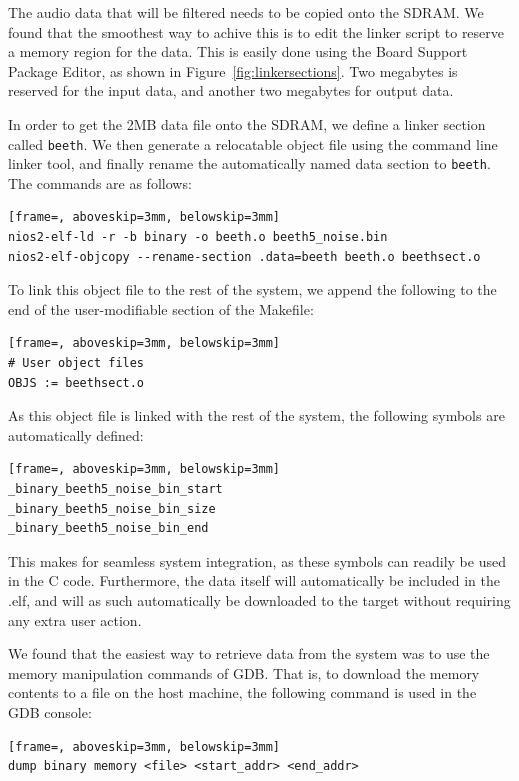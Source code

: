 \documentclass[]{article}
\begin{document}
The audio data that will be filtered needs to be copied onto the SDRAM. We found that the smoothest way to achive this is to edit the linker script to reserve a memory region for the data. This is easily done using the Board Support Package Editor, as shown in Figure~\ref{fig:linkersections}.
Two megabytes is reserved for the input data, and another two megabytes for output data.

In order to get the 2MB data file onto the SDRAM, we define a linker section called \verb"beeth". We then generate a relocatable object file using the command line linker tool, and finally rename the automatically named data section to \verb"beeth".
The commands are as follows:

\begin{lstlisting}[frame=, aboveskip=3mm, belowskip=3mm]
nios2-elf-ld -r -b binary -o beeth.o beeth5_noise.bin
nios2-elf-objcopy --rename-section .data=beeth beeth.o beethsect.o
\end{lstlisting}

To link this object file to the rest of the system, we append the following to the end of the user-modifiable section of the Makefile:

\begin{lstlisting}[frame=, aboveskip=3mm, belowskip=3mm]
# User object files
OBJS := beethsect.o
\end{lstlisting}

As this object file is linked with the rest of the system, the following symbols are automatically defined:

\begin{lstlisting}[frame=, aboveskip=3mm, belowskip=3mm]
_binary_beeth5_noise_bin_start
_binary_beeth5_noise_bin_size
_binary_beeth5_noise_bin_end
\end{lstlisting}

This makes for seamless system integration, as these symbols can readily be used in the C code. Furthermore, the data itself will automatically be included in the .elf, and will as such automatically be downloaded to the target without requiring any extra user action.

We found that the easiest way to retrieve data from the system was to use the memory manipulation commands of GDB. That is, to download the memory contents to a file on the host machine, the following command is used in the GDB console:

\begin{lstlisting}[frame=, aboveskip=3mm, belowskip=3mm]
dump binary memory <file> <start_addr> <end_addr>
\end{lstlisting}


\end{document}
